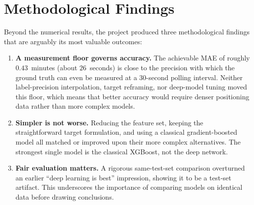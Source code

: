 \section{Methodological Findings}

Beyond the numerical results, the project produced three methodological findings that are arguably its most valuable outcomes:

\begin{enumerate}
    \item \textbf{A measurement floor governs accuracy.} The achievable MAE of roughly $0.43$~minutes (about $26$~seconds) is close to the precision with which the ground truth can even be measured at a 30-second polling interval. Neither label-precision interpolation, target reframing, nor deep-model tuning moved this floor, which means that better accuracy would require denser positioning data rather than more complex models.
    \item \textbf{Simpler is not worse.} Reducing the feature set, keeping the straightforward target formulation, and using a classical gradient-boosted model all matched or improved upon their more complex alternatives. The strongest single model is the classical XGBoost, not the deep network.
    \item \textbf{Fair evaluation matters.} A rigorous same-test-set comparison overturned an earlier ``deep learning is best'' impression, showing it to be a test-set artifact. This underscores the importance of comparing models on identical data before drawing conclusions.
\end{enumerate}

